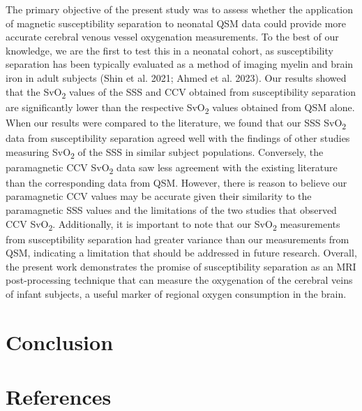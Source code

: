 \documentclass[
sn-nature
]{sn-jnl}
\begin{document}
The primary objective of the present study was to assess whether the
application of magnetic susceptibility separation to neonatal QSM data
could provide more accurate cerebral venous vessel oxygenation
measurements. To the best of our knowledge, we are the first to test
this in a neonatal cohort, as susceptibility separation has been
typically evaluated as a method of imaging myelin and brain iron in
adult subjects (Shin et al. 2021; Ahmed et al. 2023). Our results showed
that the SvO\textsubscript{2} values of the SSS and CCV obtained from
susceptibility separation are significantly lower than the respective
SvO\textsubscript{2} values obtained from QSM alone. When our results
were compared to the literature, we found that our SSS
SvO\textsubscript{2} data from susceptibility separation agreed well
with the findings of other studies measuring SvO\textsubscript{2} of the
SSS in similar subject populations. Conversely, the paramagnetic CCV
SvO\textsubscript{2} data saw less agreement with the existing
literature than the corresponding data from QSM. However, there is
reason to believe our paramagnetic CCV values may be accurate given
their similarity to the paramagnetic SSS values and the limitations of
the two studies that observed CCV SvO\textsubscript{2}. Additionally, it
is important to note that our SvO\textsubscript{2} measurements from
susceptibility separation had greater variance than our measurements
from QSM, indicating a limitation that should be addressed in future
research. Overall, the present work demonstrates the promise of
susceptibility separation as an MRI post-processing technique that can
measure the oxygenation of the cerebral veins of infant subjects, a
useful marker of regional oxygen consumption in the brain.

\section{Conclusion}\label{sec-conclusion}

\section*{References}\label{references}
\end{document}
